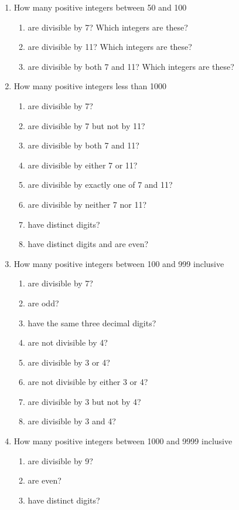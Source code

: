 \documentclass[11pt,a4paper]{book}
\begin{document}
\begin{enumerate}
\begin{enumerate}[label=(\alph*)]
\end{enumerate}
\item How many positive integers between 50 and 100
\begin{enumerate}[label=(\alph*)]
\item are divisible by 7? Which integers are these?
\item are divisible by 11? Which integers are these?
\item are divisible by both 7 and 11? Which integers are
these?
\end{enumerate}
\item How many positive integers less than 1000
\begin{enumerate}[label=(\alph*)]
\item are divisible by 7?
\item are divisible by 7 but not by 11?
\item are divisible by both 7 and 11?
\item are divisible by either 7 or 11?
\item are divisible by exactly one of 7 and 11?
\item are divisible by neither 7 nor 11?
\item have distinct digits?
\item have distinct digits and are even?
\end{enumerate}
\item How many positive integers between 100 and 999 inclusive
\begin{enumerate}[label=(\alph*)]
\item are divisible by 7?
\item are odd?
\item have the same three decimal digits?
\item are not divisible by 4?
\item are divisible by 3 or 4?
\item are not divisible by either 3 or 4?
\item are divisible by 3 but not by 4?
\item are divisible by 3 and 4?
\end{enumerate}
\item How many positive integers between 1000 and 9999 inclusive 
\begin{enumerate}[label=(\alph*)]
\item are divisible by 9?
\item are even?
\item have distinct digits?

\end{enumerate}
\end{enumerate}
\end{document}
